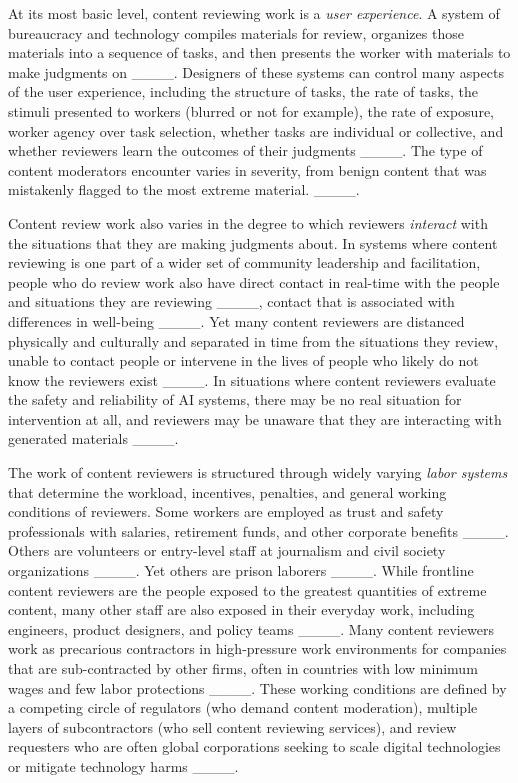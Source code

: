 At its most basic level, content reviewing work is a \textit{user experience}. A system of bureaucracy and technology compiles materials for review, organizes those materials into a sequence of tasks, and then presents the worker with materials to make judgments on ____. Designers of these systems can control many aspects of the user experience, including the structure of tasks, the rate of tasks, the stimuli presented to workers (blurred or not for example), the rate of exposure, worker agency over task selection, whether tasks are individual or collective, and whether reviewers learn the outcomes of their judgments ____. The type of content moderators encounter varies in severity, from benign content that was mistakenly flagged to the most extreme material. ____.

Content review work also varies in the degree to which reviewers \textit{interact} with the situations that they are making judgments about. In systems where content reviewing is one part of a wider set of community leadership and facilitation, people who do review work also have direct contact in real-time with the people and situations they are reviewing ____, contact that is associated with differences in well-being ____. Yet many content reviewers are distanced physically and culturally and separated in time from the situations they review, unable to contact people or intervene in the lives of people who likely do not know the reviewers exist ____. In situations where content reviewers evaluate the safety and reliability of AI systems, there may be no real situation for intervention at all, and reviewers may be unaware that they are interacting with generated materials ____.

The work of content reviewers is structured through widely varying \textit{labor systems} that determine the workload, incentives, penalties, and general working conditions of reviewers. Some workers are employed as trust and safety professionals with salaries, retirement funds, and other corporate benefits ____. Others are volunteers or entry-level staff at journalism and civil society organizations ____. Yet others are prison laborers ____. While frontline content reviewers are the people exposed to the greatest quantities of extreme content, many other staff are also exposed in their everyday work, including engineers, product designers, and policy teams ____. Many content reviewers work as precarious contractors in high-pressure work environments for companies that are sub-contracted by other firms, often in countries with low minimum wages and few labor protections ____. These working conditions are defined by a competing circle of regulators (who demand content moderation), multiple layers of subcontractors (who sell content reviewing services), and review requesters who are often global corporations seeking to scale digital technologies or mitigate technology harms ____.

